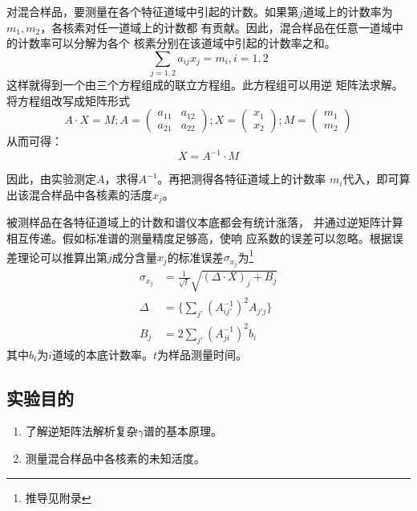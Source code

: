 \documentclass{article}
\begin{document}
    对混合样品，要测量在各个特征道域中引起的计数。如果第$j$道域上的计数率为$m_1,m_2$，各核素对任一道域上的计数都 有贡献。因此，混合样品在任意一道域中的计数率可以分解为各个 核素分别在该道域中引起的计数率之和。
    \begin{equation}
        \sum_{j = 1,2} a_{ij}x_{j} = m_i, i = 1,2 
    \end{equation}
    这样就得到一个由三个方程组成的联立方程组。此方程组可以用逆
    矩阵法求解。将方程组改写成矩阵形式
    \begin{equation}
        A\cdot X = M;A=\begin{pmatrix}
            a_{11}&a_{12}\\a_{21}&a_{22}
        \end{pmatrix};X=\begin{pmatrix}
                x_1\\x_2
            \end{pmatrix};M=\begin{pmatrix}
                m_1\\m_2
            \end{pmatrix}
    \end{equation}
    从而可得：\begin{equation}
        X = A^{-1}\cdot M
    \end{equation}

    因此，由实验测定$A$，求得$A^{-1}$。再把测得各特征道域上的计数率 $m_i$代入，即可算出该混合样品中各核素的活度$x_j$。

    被测样品在各特征道域上的计数和谱仪本底都会有统计涨落， 并通过逆矩阵计算相互传递。假如标准谱的测量精度足够高，使响 应系数的误差可以忽略。根据误差理论可以推算出第$j$成分含量$x_j$的标准误差$\sigma_{x_j}$为\footnote{推导见附录}
    \begin{equation}
        \begin{aligned}
            \sigma_{x_j} &= \frac{1}{\sqrt{t}}\sqrt{(\Delta\cdot X)_j+B_j}\\
            \Delta &= \{\sum_{j'}(A^{-1}_{ij'})^2A_{j'j}\} \\
            B_j &= 2\sum_{j'}(A^{-1}_{ji})^2b_{i} 
        \end{aligned}
    \end{equation}
    其中$b_i$为$i$道域的本底计数率。$t$为样品测量时间。
    \subsection{实验目的}
    \begin{enumerate}
        \item 了解逆矩阵法解析复杂$\gamma$谱的基本原理。
        \item 测量混合样品中各核素的未知活度。
    \end{enumerate}
\end{document}

